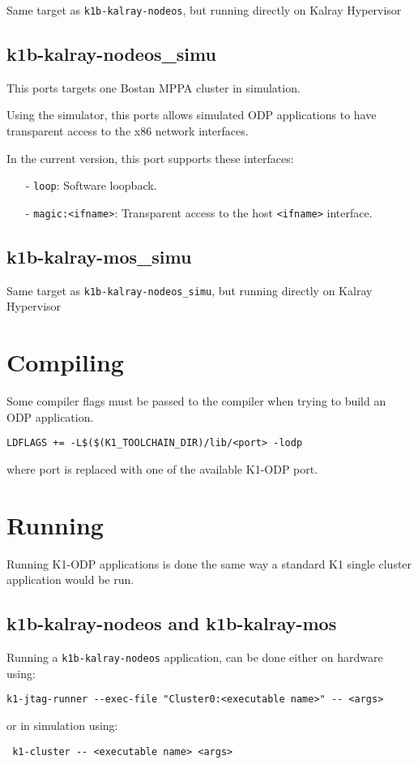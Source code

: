 \documentclass{trkalray}
\begin{document}
Same target as \texttt{k1b-kalray-nodeos}, but running directly on
Kalray Hypervisor

\subsection{k1b-kalray-nodeos\_simu}

This ports targets one Bostan MPPA cluster in simulation.

Using the simulator, this ports allows simulated ODP applications to
have transparent access to the x86 network interfaces.

In the current version, this port supports these interfaces:
\begin{itemize}
\item[-]{\texttt{loop}: Software loopback.}
\item[-]{\texttt{magic:<ifname>}: Transparent access to the host
  \texttt{<ifname>} interface.}
\end{itemize}

\subsection{k1b-kalray-mos\_simu}

Same target as \texttt{k1b-kalray-nodeos\_simu}, but running directly on
Kalray Hypervisor

\section{Compiling}

Some compiler flags must be passed to the compiler when trying to
build an ODP application.

\begin{lstlisting}
LDFLAGS += -L$($(K1_TOOLCHAIN_DIR)/lib/<port> -lodp
\end{lstlisting}
where port is replaced with one of the available K1-ODP port.

\section{Running}

Running K1-ODP applications is done the same way a standard K1 single
cluster application would be run.

\subsection{k1b-kalray-nodeos and k1b-kalray-mos}
Running a \texttt{k1b-kalray-nodeos} application, can be done either
on hardware using:
\begin{lstlisting}
k1-jtag-runner --exec-file "Cluster0:<executable name>" -- <args>
\end{lstlisting}
or in simulation using:
\begin{lstlisting}
 k1-cluster -- <executable name> <args>
\end{lstlisting}
\end{document}
